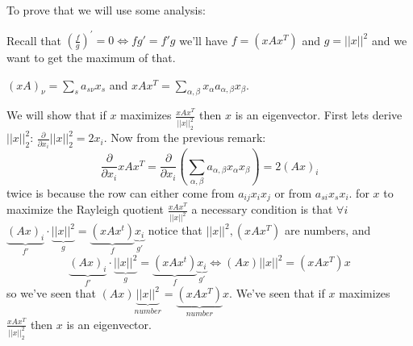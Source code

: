 To prove that we will use some analysis:
\begin{remark}
Recall that $\left(\frac{f}{g}\right)^{'}=0\iff fg'=f'g$ we'll have
$f=\left(xAx^{T}\right)$ and $g=\left|\left|x\right|\right|^{2}$
and we want to get the maximum of that.
\end{remark}

\begin{remark}
$\left(xA\right)_{\nu}=\sum\limits _{s}a_{s\nu}x_{s}$ and $xAx^{T}=\sum_{\alpha,\beta}x_{\alpha}a_{\alpha,\beta}x_{\beta}$.
\end{remark}

We will show that if $x$ maximizes $\frac{xAx^{T}}{\left|\left|x\right|\right|_{2}^{2}}$
then $x$ is an eigenvector. First lets derive $\left|\left|x\right|\right|_{2}^{2}$:
$\frac{\partial}{\partial x_{i}}\left|\left|x\right|\right|_{2}^{2}=2x_{i}$.
Now from the previous remark:
\[
\frac{\partial}{\partial x_{i}}xAx^{T}=\frac{\partial}{\partial x_{i}}\left(\sum\limits _{\alpha,\beta}a_{\alpha,\beta}x_{\alpha}x_{\beta}\right)=2\left(Ax\right)_{i}
\]
 twice is because the row can either come from $a_{ij}x_{i}x_{j}$
or from $a_{si}x_{s}x_{i}$. for $x$ to maximize the Rayleigh quotient
$\frac{xAx^{T}}{\left|\left|x\right|\right|^{2}}$ a necessary condition
is that $\forall i$ $\underbrace{\left(Ax\right)_{i}}_{f'}\cdot\underbrace{\left|\left|x\right|\right|^{2}}_{g}=\underbrace{\left(xAx^{t}\right)}_{f}\underbrace{x_{i}}_{g'}$
notice that $\left|\left|x\right|\right|^{2},\left(xAx^{T}\right)$
are numbers, and 
\[
\underbrace{\left(Ax\right)_{i}}_{f'}\cdot\underbrace{\left|\left|x\right|\right|^{2}}_{g}=\underbrace{\left(xAx^{t}\right)}_{f}\underbrace{x_{i}}_{g'}\iff\left(Ax\right)\left|\left|x\right|\right|^{2}=\left(xAx^{T}\right)x
\]
so we've seen that $\left(Ax\right)\underbrace{\left|\left|x\right|\right|^{2}}_{number}=\underbrace{\left(xAx^{T}\right)}_{number}x$.
We've seen that if $x$ maximizes $\frac{xAx^{T}}{\left|\left|x\right|\right|_{2}^{2}}$
then $x$ is an eigenvector.

